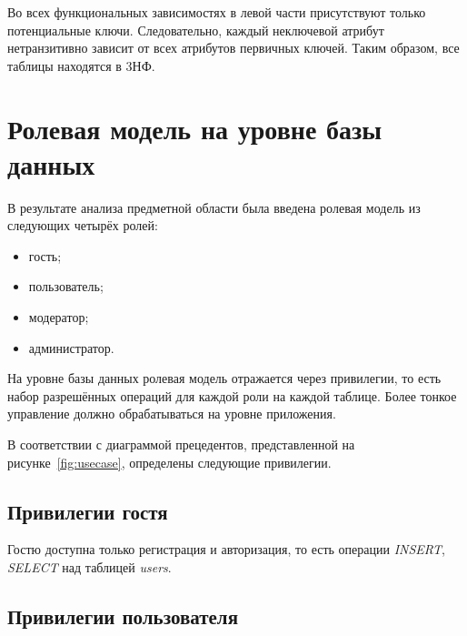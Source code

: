 Во всех функциональных зависимостях в левой части присутствуют только потенциальные ключи.
Следовательно, каждый неключевой атрибут нетранзитивно зависит от всех атрибутов первичных ключей.
Таким образом, все таблицы находятся в 3НФ.


\section{Ролевая модель на уровне базы данных}

В результате анализа предметной области была введена ролевая модель из следующих четырёх ролей:
\begin{itemize}
    \item гость;
    \item пользователь;
    \item модератор;
    \item администратор.
\end{itemize}

На уровне базы данных ролевая модель отражается через привилегии, то есть набор разрешённых операций для каждой роли на каждой таблице.
Более тонкое управление должно обрабатываться на уровне приложения.

В соответствии с диаграммой прецедентов, представленной на рисунке~\ref{fig:usecase}, определены следующие привилегии.

\subsection*{Привилегии гостя}

Гостю доступна только регистрация и авторизация, то есть операции \textit{INSERT}, \textit{SELECT} над таблицей \textit{users}.

\subsection*{Привилегии пользователя}


